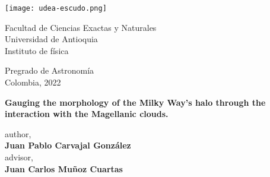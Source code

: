 \begin{titlepage}
    \begin{center}
        \texttt{[image: udea-escudo.png]}
        
        \vspace{1.5cm}
        
        \large
        Facultad de Ciencias Exactas y Naturales\\
        Universidad de Antioquia\\
        Instituto de física\\
        
        \vspace{0.5cm}
        
        \large
        Pregrado de Astronomía\\
        Colombia, 2022\\
        
        \vspace{1.3cm}
        
        \Large
        \textbf{Gauging the morphology of the Milky Way's halo through the interaction with the Magellanic clouds.}
        
        
        \vspace{1.5cm}
        \small{author,\\}
        \large{\textbf{Juan Pablo Carvajal González}\\}
        \vspace{1.5cm}
        \small{advisor,\\}
        \large{\textbf{Juan Carlos Muñoz Cuartas}\\}
        \vfill
        
    \end{center}
\end{titlepage}